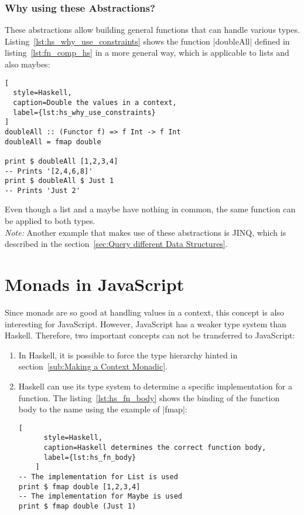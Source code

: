 \subsubsection{Why using these Abstractions?} %
\label{subsub:Why using these Abstractions?}
These abstractions allow building general functions that can handle various
types. Listing~\ref{lst:hs_why_use_constraints} shows the function |doubleAll|
defined in listing~\ref{lst:fn_comp_hs} in a more general way, which is
applicable to lists and also maybes:

\begin{lstlisting}[
  style=Haskell,
  caption=Double the values in a context,
  label={lst:hs_why_use_constraints}
]
doubleAll :: (Functor f) => f Int -> f Int
doubleAll = fmap double

print $ doubleAll [1,2,3,4]
-- Prints '[2,4,6,8]'
print $ doubleAll $ Just 1
-- Prints 'Just 2'
\end{lstlisting}
Even though a list and a maybe have nothing in common, the same function can be
applied to both types. \\
\textit{Note:} Another example that makes use of these abstractions is JINQ,
which is described in the section~\ref{sec:Query different Data Structures}.

\section{Monads in JavaScript} %
\label{sec:Monads in JavaScript}
Since monads are so good at handling values in a context, this concept is also
interesting for JavaScript. However, JavaScript has a weaker type system than
Haskell. Therefore, two important concepts can not be transferred to
JavaScript: 
\begin{enumerate}
  \item In Haskell, it is possible to force the type hierarchy hinted in
    section~\ref{sub:Making a Context Monadic}.
  \item Haskell can use its type system to determine a specific implementation
    for a function. The listing~\ref{lst:hs_fn_body} shows the binding of the
    function body to the name using the example of |fmap|:
    \begin{lstlisting}[
      style=Haskell,
      caption=Haskell determines the correct function body,
      label={lst:hs_fn_body}
    ]
-- The implementation for List is used
print $ fmap double [1,2,3,4]
-- The implementation for Maybe is used
print $ fmap double (Just 1)
    \end{lstlisting}
\end{enumerate}


